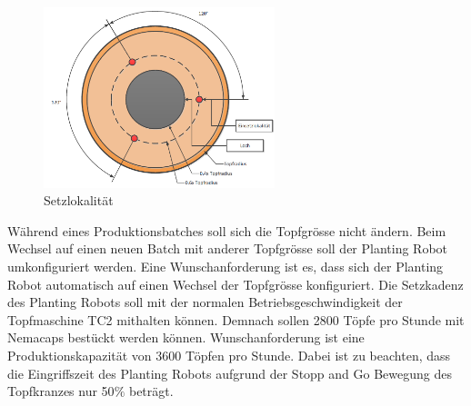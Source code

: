 \begin{figure}[H]
	\includegraphics[width=0.6\textwidth]{Illustrationen/4-Entwurf/Setzprozess.png}
	\caption{Setzlokalität}
	\label{fig:Setzprozess}
\end{figure}

Während eines Produktionsbatches soll sich die Topfgrösse nicht ändern. Beim Wechsel auf einen neuen Batch mit anderer Topfgrösse soll der Planting Robot umkonfiguriert werden. Eine Wunschanforderung ist es, dass sich der Planting Robot automatisch auf einen Wechsel der Topfgrösse konfiguriert. Die Setzkadenz des Planting Robots soll mit der normalen Betriebsgeschwindigkeit der Topfmaschine TC2 mithalten können. Demnach sollen 2800 Töpfe pro Stunde mit Nemacaps bestückt werden können. Wunschanforderung ist eine Produktionskapazität von 3600 Töpfen pro Stunde. Dabei ist zu beachten, dass die Eingriffszeit des Planting Robots aufgrund der Stopp and Go Bewegung des Topfkranzes nur 50$\%$ beträgt.




